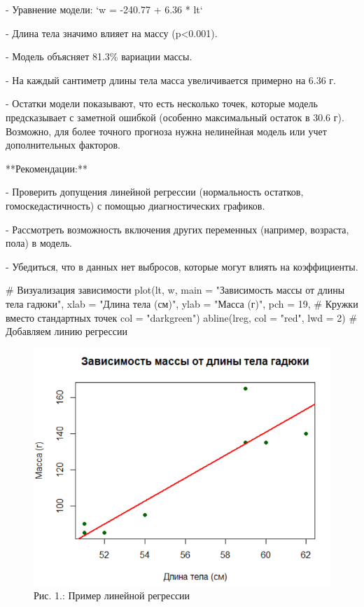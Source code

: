\documentclass[
  letterpaper,
  DIV=11,
  numbers=noendperiod]{scrreprt}
\newenvironment{Shaded}{\begin{snugshade}}{\end{snugshade}}
\newcommand{\AttributeTok}[1]{\textcolor[rgb]{0.40,0.45,0.13}{#1}}
\newcommand{\CommentTok}[1]{\textcolor[rgb]{0.37,0.37,0.37}{#1}}
\newcommand{\DecValTok}[1]{\textcolor[rgb]{0.68,0.00,0.00}{#1}}
\newcommand{\FunctionTok}[1]{\textcolor[rgb]{0.28,0.35,0.67}{#1}}
\newcommand{\NormalTok}[1]{\textcolor[rgb]{0.00,0.23,0.31}{#1}}
\newcommand{\StringTok}[1]{\textcolor[rgb]{0.13,0.47,0.30}{#1}}
\begin{document}
- Уравнение модели: `w = -240.77 + 6.36 * lt`

- Длина тела значимо влияет на массу (p\textless0.001).

- Модель объясняет 81.3\% вариации массы.

- На каждый сантиметр длины тела масса увеличивается примерно на 6.36 г.

- Остатки модели показывают, что есть несколько точек, которые модель
предсказывает с заметной ошибкой (особенно максимальный остаток в 30.6
г). Возможно, для более точного прогноза нужна нелинейная модель или
учет дополнительных факторов.

**Рекомендации:**

- Проверить допущения линейной регрессии (нормальность остатков,
гомоскедастичность) с помощью диагностических графиков.

- Рассмотреть возможность включения других переменных (например,
возраста, пола) в модель.

- Убедиться, что в данных нет выбросов, которые могут влиять на
коэффициенты.

\begin{Shaded}
\begin{Highlighting}[]
\CommentTok{\# Визуализация зависимости}
\FunctionTok{plot}\NormalTok{(lt, w, }
     \AttributeTok{main =} \StringTok{"Зависимость массы от длины тела гадюки"}\NormalTok{, }
     \AttributeTok{xlab =} \StringTok{"Длина тела (см)"}\NormalTok{, }
     \AttributeTok{ylab =} \StringTok{"Масса (г)"}\NormalTok{, }
     \AttributeTok{pch =} \DecValTok{19}\NormalTok{,        }\CommentTok{\# Кружки вместо стандартных точек}
     \AttributeTok{col =} \StringTok{"darkgreen"}\NormalTok{)}
\FunctionTok{abline}\NormalTok{(lreg, }\AttributeTok{col =} \StringTok{"red"}\NormalTok{, }\AttributeTok{lwd =} \DecValTok{2}\NormalTok{)  }\CommentTok{\# Добавляем линию регрессии}
\end{Highlighting}
\end{Shaded}

\begin{figure}[H]

{\centering \includegraphics[width=0.6\linewidth,height=\textheight,keepaspectratio]{images/KOROSOV1.PNG}

}

\caption{Рис. 1.: Пример линейной регрессии}

\end{figure}%
\end{document}
